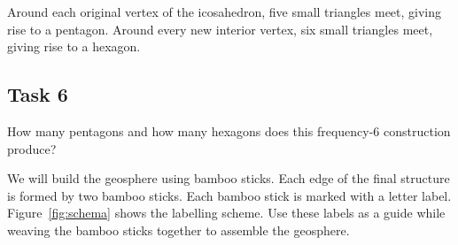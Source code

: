 \documentclass[12pt,a4paper]{tufte-handout}
\begin{document}
Around each original vertex of the icosahedron, five small triangles meet, giving rise to a pentagon. Around every new interior vertex, six small triangles meet, giving rise to a hexagon.

\subsection{Task 6}
How many pentagons and how many hexagons does this frequency-6 construction produce?

We will build the geosphere using bamboo sticks. Each edge of the final structure is formed by two bamboo sticks. Each bamboo stick is marked with a letter label. Figure~\ref{fig:schema} shows the labelling scheme\nocite{website:ccl}. Use these labels as a guide while weaving the bamboo sticks together to assemble the geosphere.
\end{document}
